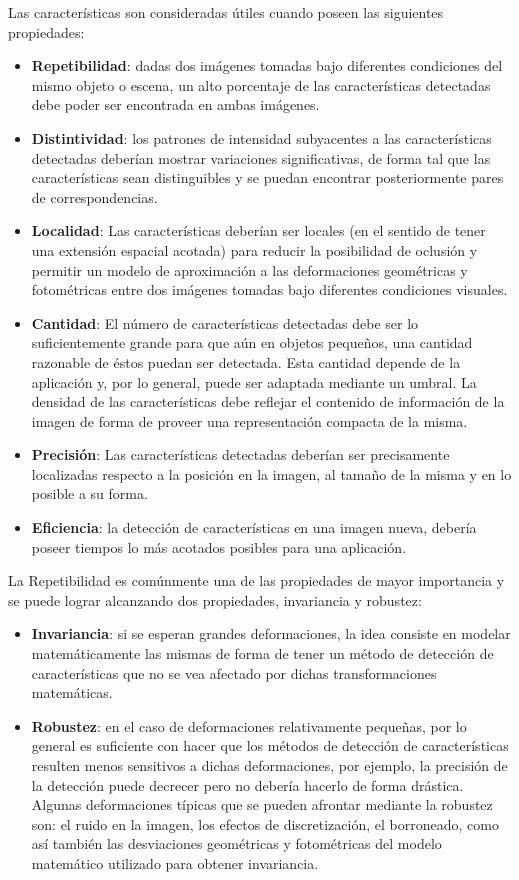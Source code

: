 Las características son consideradas útiles cuando poseen las siguientes propiedades:
\begin{itemize}
 \item \textbf{Repetibilidad}: dadas dos imágenes tomadas bajo diferentes condiciones del mismo objeto o escena, un alto porcentaje de las características detectadas debe poder ser encontrada en ambas imágenes.
 \item \textbf{Distintividad}: los patrones de intensidad subyacentes a las características detectadas deberían mostrar variaciones significativas, de forma tal que las características sean distinguibles y se puedan encontrar posteriormente pares de correspondencias.
 \item \textbf{Localidad}: Las características deberían ser locales (en el sentido de tener una extensión espacial acotada) para reducir la posibilidad de oclusión y permitir un modelo de aproximación a las deformaciones geométricas y fotométricas entre dos imágenes tomadas bajo diferentes condiciones visuales. %
 \item \textbf{Cantidad}: El número de características detectadas debe ser lo suficientemente grande para que aún en objetos pequeños, una cantidad razonable de éstos puedan ser detectada. Esta cantidad depende de la aplicación y, por lo general, puede ser adaptada mediante un umbral. La densidad de las características debe reflejar el contenido de información de la imagen de forma de proveer una representación compacta de la misma.
 \item \textbf{Precisión}: Las características detectadas deberían ser precisamente localizadas respecto a la posición en la imagen, al tamaño de la misma y en lo posible a su forma.
 \item \textbf{Eficiencia}: la detección de características en una imagen nueva, debería poseer tiempos lo más acotados posibles para una aplicación.
\end{itemize}

La Repetibilidad es comúnmente una de las propiedades de mayor importancia y se puede lograr alcanzando dos propiedades, invariancia y robustez:
\begin{itemize}
 \item \textbf{Invariancia}: si se esperan grandes deformaciones, la idea consiste en modelar matemáticamente las mismas de forma de tener un método de detección de características que no se vea afectado por dichas transformaciones matemáticas.
 \item \textbf{Robustez}: en el caso de deformaciones relativamente pequeñas, por lo general es suficiente con hacer que los métodos de detección de características resulten menos sensitivos a dichas deformaciones, por ejemplo, la precisión de la detección puede decrecer pero no debería hacerlo de forma drástica. Algunas deformaciones típicas que se pueden afrontar mediante la robustez son: el ruido en la imagen, los efectos de discretización, el borroneado, como así también las desviaciones geométricas y fotométricas del modelo matemático utilizado para obtener invariancia.
\end{itemize}

